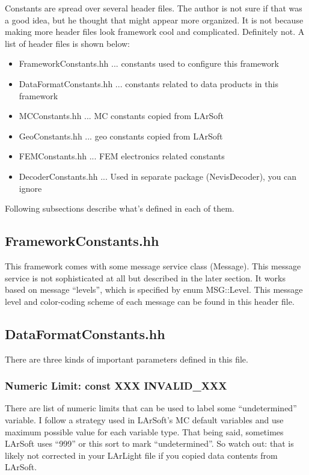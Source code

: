 
Constants are spread over several header files. 
The author is not sure if that was a good idea, but he thought that might appear more organized.
It is not because making more header files look framework cool and complicated. Definitely not.
A list of header files is shown below:
\begin{itemize}
\item[] {\ttfamily FrameworkConstants.hh} ... constants used to configure this framework
\item[] {\ttfamily DataFormatConstants.hh} ... constants related to data products in this framework
\item[] {\ttfamily MCConstants.hh} ... MC constants copied from LArSoft
\item[] {\ttfamily GeoConstants.hh} ... geo constants copied from LArSoft
\item[] {\ttfamily FEMConstants.hh} ... FEM electronics related constants
\item[] {\ttfamily DecoderConstants.hh} ... Used in separate package (NevisDecoder), you can ignore
\end{itemize}
Following subsections describe what's defined in each of them.

\subsection{FrameworkConstants.hh}
This framework comes with some message service class ({\ttfamily Message}).
This message service is not sophisticated at all but described in the later section.
It works based on message ``levels'', which is specified by {\ttfamily enum MSG::Level}.
This message level and color-coding scheme of each message can be found in this header file.

\subsection{DataFormatConstants.hh}
There are three kinds of important parameters defined in this file.

\subsubsection{Numeric Limit: {\ttfamily const XXX INVALID\_XXX}}
There are list of numeric limits that can be used to label some ``undetermined'' variable.
I follow a strategy used in LArSoft's MC default variables and use maximum possible value
for each variable type. That being said, sometimes LArSoft uses ``999'' or this sort to
mark ``undetermined''. So watch out: that is likely not corrected in your LArLight file
if you copied data contents from LArSoft.

